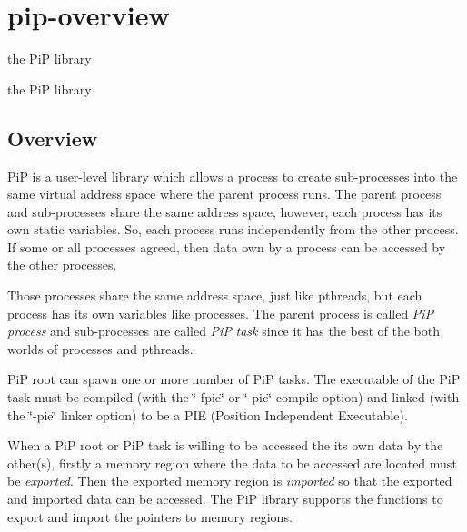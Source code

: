 \hypertarget{group__pip-overview}{\section{pip-\/overview}
\label{group__pip-overview}
}


the Pi\-P library  


the Pi\-P library \hypertarget{group__pip-overview_overview}{}\subsection{Overview}\label{group__pip-overview_overview}
Pi\-P is a user-\/level library which allows a process to create sub-\/processes into the same virtual address space where the parent process runs. The parent process and sub-\/processes share the same address space, however, each process has its own static variables. So, each process runs independently from the other process. If some or all processes agreed, then data own by a process can be accessed by the other processes.

Those processes share the same address space, just like pthreads, but each process has its own variables like processes. The parent process is called {\itshape Pi\-P} {\itshape process} and sub-\/processes are called {\itshape Pi\-P} {\itshape task} since it has the best of the both worlds of processes and pthreads.

Pi\-P root can spawn one or more number of Pi\-P tasks. The executable of the Pi\-P task must be compiled (with the \char`\"{}-\/fpie\char`\"{} or \char`\"{}-\/pic\char`\"{} compile option) and linked (with the \char`\"{}-\/pie\char`\"{} linker option) to be a P\-I\-E (Position Independent Executable).

When a Pi\-P root or Pi\-P task is willing to be accessed the its own data by the other(s), firstly a memory region where the data to be accessed are located must be {\itshape exported}. Then the exported memory region is {\itshape imported} so that the exported and imported data can be accessed. The Pi\-P library supports the functions to export and import the pointers to memory regions.

